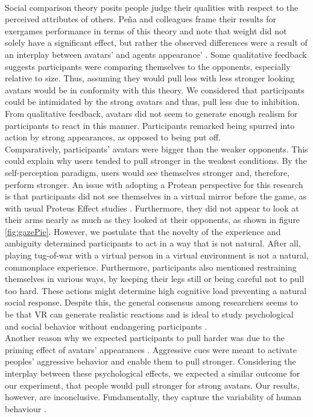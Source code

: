 \\
Social comparison theory posits people judge their qualities with respect to the perceived attributes of others. Peña and colleagues frame their results for exergames performance in terms of this theory and note that weight did not solely have a significant effect, but rather the observed differences were a result of an interplay between avatars' and agents appearance' \cite{pena2016see}. Some qualitative feedback suggests participants were comparing themselves to the opponents, especially relative to size. Thus, assuming they would pull less with less stronger looking avatars would be in conformity with this theory. We considered that participants could be intimidated by the strong avatars and thus, pull less due to inhibition. From qualitative feedback, avatars did not seem to generate enough realism for participants to react in this manner. Participants remarked being spurred into action by strong appearances, as opposed to being put off.
\\
 Comparatively, participants' avatars were bigger than the weaker opponents. This could explain why users tended to pull stronger in the weakest conditions. By the self-perception paradigm, users would see themselves stronger and, therefore, perform stronger. An issue with adopting a Protean perspective for this research is that participants did not see themselves in a virtual mirror before the game, as with usual Proteus Effect studies \cite{bailenson2006transformed}. Furthermore, they did not appear to look at their arms nearly as much as they looked at their opponents, as shown in figure \ref{fig:gazePie}. However, we postulate that the novelty of the experience and ambiguity determined participants to act in a way that is not natural. After all, playing tug-of-war with a virtual person in a virtual environment is not a natural, commonplace experience. Furthermore, participants also mentioned restraining themselves in various ways, by keeping their legs still or being careful not to pull too hard. These actions might determine high cognitive load preventing a natural social response. Despite this, the general consensus among researchers seems to be that VR can generate realistic reactions and is ideal to study psychological and social behavior without endangering participants \cite{fox2009virtual}. \\
Another reason why we expected participants to pull harder was due to the priming effect of avatars' appearances \cite{pena2009priming}. Aggressive cues were meant to activate peoples' aggressive behavior and enable them to pull stronger. Considering the interplay between these psychological effects, we expected a similar outcome for our experiment, that people would pull stronger for strong avatars. Our results, however, are inconclusive. Fundamentally, they capture the variability of human behaviour .
